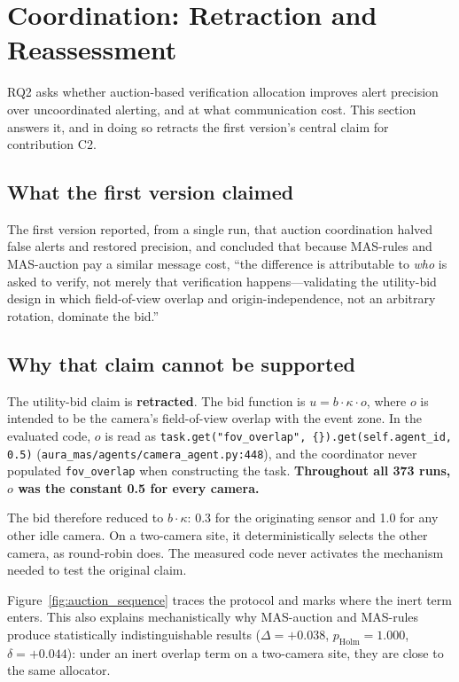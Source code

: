 \section{Coordination: Retraction and Reassessment}
\label{sec:c2_retraction}

RQ2 asks whether auction-based verification allocation improves alert precision over uncoordinated alerting, and at what communication cost. This section answers it, and in doing so retracts the first version's central claim for contribution C2.

\subsection{What the first version claimed}

The first version reported, from a single run, that auction coordination halved false alerts and restored precision, and concluded that because MAS-rules and MAS-auction pay a similar message cost, ``the difference is attributable to \emph{who} is asked to verify, not merely that verification happens---validating the utility-bid design in which field-of-view overlap and origin-independence, not an arbitrary rotation, dominate the bid.''

\subsection{Why that claim cannot be supported}

\begin{revisionbox}
	The utility-bid claim is \textbf{retracted}. The bid function is $u = b\cdot\kappa\cdot o$, where $o$ is intended to be the camera's field-of-view overlap with the event zone. In the evaluated code, $o$ is read as \texttt{task.get("fov\_overlap", \{\}).get(self.agent\_id, 0.5)} (\texttt{aura\_mas/agents/camera\_agent.py:448}), and the coordinator never populated \texttt{fov\_overlap} when constructing the task. \textbf{Throughout all 373 runs, $o$ was the constant 0.5 for every camera.}

	The bid therefore reduced to $b\cdot\kappa$: 0.3 for the originating sensor and 1.0 for any other idle camera. On a two-camera site, it deterministically selects the other camera, as round-robin does. The measured code never activates the mechanism needed to test the original claim.
\end{revisionbox}

Figure~\ref{fig:auction_sequence} traces the protocol and marks where the inert term enters. This also explains mechanistically why MAS-auction and MAS-rules produce statistically indistinguishable results ($\Delta=+0.038$, $p_{\text{Holm}}=1.000$, $\delta=+0.044$): under an inert overlap term on a two-camera site, they are close to the same allocator.

